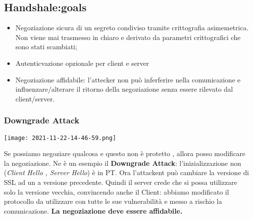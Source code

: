 \documentclass{article}
\theoremstyle{remark}
\begin{document}
\subsection{Handshale:goals}
\begin{itemize}
    \item Negoziazione sicura di un segreto condiviso tramite crittografia asimemetrica. Non viene mai trasmesso in chiaro e derivato
    da parametri crittografici che sono stati scambiati;
    \item Autenticvazione opzionale per client e server
    \item Negoziazione affidabile: l'attecker non può inferferire nella comunicazione e influenzare/alterare il ritorno della negoziazione senza essere rilevato dal client/server.
\end{itemize}
\subsubsection{Downgrade Attack}
\begin{center}
    \texttt{[image: 2021-11-22-14-46-59.png]}
\end{center}
Se possiamo negoziare qualcosa e questo non è protetto , allora posso modificare la negoziazione. Ne è un esempio
il \textbf{Downgrade Attack}: l'inizializzazione non (\emph{Client Hello , Server Hello}) è in PT. Ora l'attackent può cambiare la
versione di SSL ad un a versione precedente. Quindi il server crede che si possa utilizzare solo la versione vecchia, convincendo anche 
il Client: abbiamo modificato il protocollo da utilizzare con tutte le sue vulnerabilità e messo a rischio la comunicazione.
\textbf{La negoziazione deve essere affidabile.}
\end{document}
